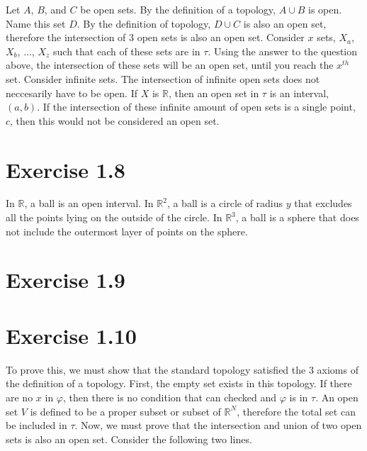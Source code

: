 \documentclass{report}
\begin{document}
\medskip
\sol Let $A$, $B$, and $C$ be open sets. By the definition of a topology, $A \cup B$ is open. Name this set $D$. By the definition of topology, $D \cup C$ is also an open set, therefore the intersection of $3$ open sets is also an open set. 
\medskip
{}
\medskip
\sol Consider $x$ sets, $X_a$, $X_b$, $\dots$, $X_z$ such that each of these sets are in $\tau$. Using the answer to the question above, the intersection of these sets will be an open set, until you reach the $x^{th}$ set. 
\medskip
{}
\medskip
\sol Consider infinite sets. The intersection of infinite open sets does not neccesarily have to be open. If $X$ is $\mathbb{R}$, then an open set in $\tau$ is an interval, $(a, b)$. If the intersection of these infinite amount of open sets is a single point, ${c}$, then this would not be considered an open set. 
\medskip


\section{Exercise 1.8}
\medskip
\sol In $\mathbb{R}$, a ball is an open interval. In $\mathbb{R}^2$, a ball is a circle of radius $y$ that excludes all the points lying on the outside of the circle. In $\mathbb{R}^3$, a ball is a sphere that does not include the outermost layer of points on the sphere. 
\medskip
\section{Exercise 1.9}
\medskip


\section{Exercise 1.10}

\medskip
\sol To prove this, we must show that the standard topology satisfied the $3$ axioms of the definition of a topology. First, the empty set exists in this topology. If there are no $x$ in $\varphi$, then there is no condition that can checked and $\varphi$ is in $\tau$. An open set $V$ is defined to be a proper subset or subset of $\mathbb{R}^N$, therefore the total set can be included in $\tau$. Now, we must prove that the intersection and union of two open sets is also an open set. Consider the following two lines. 
\end{document}
